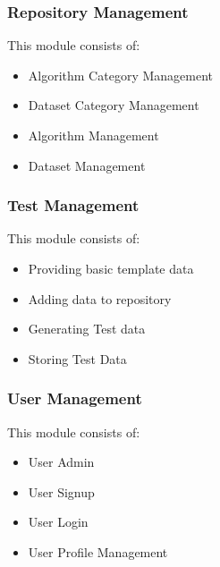 \subsubsection{Repository Management}
This module consists of:
\begin{itemize}
	\item Algorithm Category Management
	\item Dataset Category Management
	\item Algorithm Management
	\item Dataset Management
\end{itemize}

\subsubsection{Test Management}
This module consists of:
\begin{itemize}
	\item Providing basic template data
	\item Adding data to repository
	\item Generating Test data
	\item Storing Test Data
\end{itemize}

\subsubsection{User Management}
This module consists of:
\begin{itemize}
  \item User Admin
  \item User Signup
  \item User Login
  \item User Profile Management
\end{itemize}



